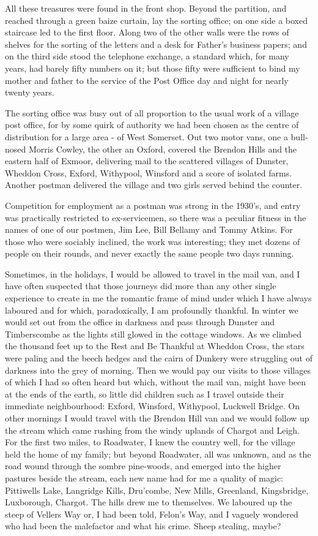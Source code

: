 All these treasures were found in the front shop. Beyond the partition, and reached through a green baize curtain, lay the sorting office; on one side a boxed staircase led to the first floor. Along two of the other walls were the rows of shelves for the sorting of the letters and a desk for Father's business papers; and on the third side stood the telephone exchange, a standard which, for many years, had barely fifty numbers on it; but those fifty were sufficient to bind my mother and father to the service of the Post Office day and night for nearly twenty years.

The sorting office was busy out of all proportion to the usual work of a village post office, for by some quirk of authority we had been chosen as the centre of distribution for a large area - of West Somerset. Out two motor vans, one a bull-nosed Morris Cowley, the other an Oxford, covered the Brendon Hills and the eastern half of Exmoor, delivering mail to the scattered villages of Dunster, Wheddon Cross, Exford, Withypool, Winsford and a score of isolated farms. Another postman delivered the village and two girls served behind the counter.

Competition for employment as a postman was strong in the 1930's, and entry was practically restricted to ex-servicemen, so there was a peculiar fitness in the names of one of our postmen, Jim Lee, Bill Bellamy and Tommy Atkins. For those who were sociably inclined, the work was interesting; they met dozens of people on their rounds, and never exactly the same people two days running.

Sometimes, in the holidays, I would be allowed to travel in the mail van, and I have often suspected that those journeys did more than any other single experience to create in me the romantic frame of mind under which I have always laboured and for which, paradoxically, I am profoundly thankful. In winter we would set out from the office in darkness and pass through Dunster and Timberscombe as the lights still glowed in the cottage windows. As we climbed the thousand feet up to the Rest and Be Thankful at Wheddon Cross, the stars were paling and the beech hedges and the cairn of Dunkery were struggling out of darkness into the grey of morning. Then we would pay our visits to those villages of which I had so often heard but which, without the mail van, might have been at the ends of the earth, so little did children such as I travel outside their immediate neighbourhood: Exford, Winsford, Withypool, Luckwell Bridge. On other mornings I would travel with the Brendon Hill van and we would follow up the stream which came rushing from the windy uplands of Chargot and Leigh. For the first two miles, to Roadwater, I knew the country well, for the village held the home of my family; but beyond Roadwater, all was unknown, and as the road wound through the sombre pine-woods, and emerged into the higher pastures beside the stream, each new name had for me a quality of magic: Pittiwells Lake, Langridge Kills, Dru'combe, New Mills, Greenland, Kingsbridge, Luxborough, Chargot. The hills drew me to themselves. We laboured up the steep of Vellers Way or, I had been told, Felon's Way, and I vaguely wondered who had been the malefactor and what his crime. Sheep stealing, maybe?

